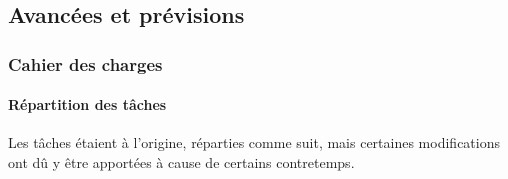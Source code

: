 \subsection{Avancées et prévisions}

    \subsubsection{Cahier des charges}

    \paragraph{Répartition des tâches}
        Les tâches étaient à l'origine, réparties comme suit, mais certaines modifications ont dû y être apportées 
        à cause de certains contretemps.


